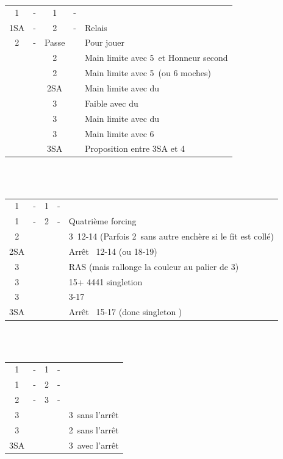 \documentclass[a4paper, oneside, 11pt]{report}
\begin{document}
		\begin{tabular}{cccc|l}
		1\coeur & - & 1\pique & - &\\
		1SA & - & 2\trefle & - & Relais\\
		2\carreau & - & Passe && Pour jouer\\
		&& 2\coeur && Main limite avec 5\pique\ et Honneur second \coeur\\
		&& 2\pique && Main limite avec 5\pique\ (ou 6 moches)\\
		&& 2SA && Main limite avec du \trefle\\
		&& 3\trefle && Faible avec du \trefle\\
		&& 3\carreau && Main limite avec du \carreau\\
		&& 3\pique && Main limite avec 6\pique\\
		&& 3SA && Proposition entre 3SA et 4\pique\\
		\end{tabular}\\\\

		\begin{tabular}{cccc|l}
		1\trefle & - & 1\coeur & - &\\
		1\pique & - & 2\carreau & - & Quatrième forcing\\
		2\coeur &&&& 3\coeur\ 12-14 (Parfois 2\coeur\ sans autre enchère si le fit est collé)\\
		2SA &&&& Arrêt \carreau\ 12-14 (ou 18-19)\\
		3\trefle &&&& RAS (mais rallonge la couleur au palier de 3)\\
		3\carreau &&&& 15+ 4441 singletion \coeur\\
		3\coeur &&&& 3\coeur 15-17\\
		3SA &&&& Arrêt \carreau\ 15-17 (donc singleton \coeur)\\
		\end{tabular}\\\\
			
		\begin{tabular}{cccc|l}
		1\trefle & - & 1\coeur & - &\\
		1\pique & - & 2\carreau & - & \\
		2\coeur & - & 3\carreau & - &\\
		3\coeur &&&& 3\coeur\ sans l'arrêt \carreau\\
		3\pique &&&& 2\coeur\ sans l'arrêt \carreau\\
		3SA &&&& 3\coeur\ avec l'arrêt \carreau\\
		\end{tabular}\\\\
	
\end{document}
